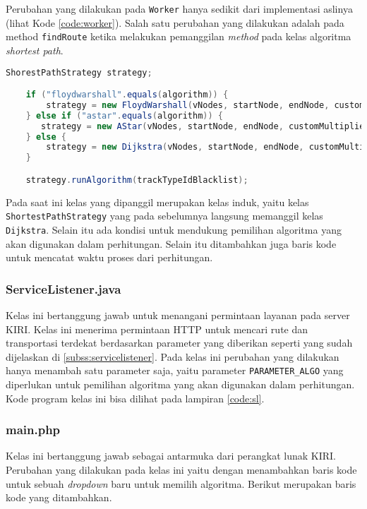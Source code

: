 Perubahan yang dilakukan pada \texttt{Worker} hanya sedikit dari implementasi aslinya (lihat Kode \ref{code:worker}). Salah satu perubahan yang dilakukan adalah pada method \texttt{findRoute} ketika melakukan pemanggilan \textit{method} pada kelas algoritma \textit{shortest path}.
\begin{lstlisting}[language=Java, caption=Worker.java, basicstyle=\small\ttfamily]
    ShorestPathStrategy strategy;

    if ("floydwarshall".equals(algorithm)) {
        strategy = new FloydWarshall(vNodes, startNode, endNode, customMultiplierWalking, customPenaltyTransfer);
	} else if ("astar".equals(algorithm)) {
	   strategy = new AStar(vNodes, startNode, endNode, customMultiplierWalking, customPenaltyTransfer);
	} else {
		strategy = new Dijkstra(vNodes, startNode, endNode, customMultiplierWalking, customPenaltyTransfer);
	}

    strategy.runAlgorithm(trackTypeIdBlacklist);
\end{lstlisting}

Pada saat ini kelas yang dipanggil merupakan kelas induk, yaitu kelas \texttt{ShortestPathStrategy} yang pada sebelumnya langsung memanggil kelas \texttt{Dijkstra}. Selain itu ada kondisi untuk mendukung pemilihan algoritma yang akan digunakan dalam perhitungan. Selain itu ditambahkan juga baris kode untuk mencatat waktu proses dari perhitungan.

\subsubsection{ServiceListener.java}
Kelas ini bertanggung jawab untuk menangani permintaan layanan pada server KIRI. Kelas ini menerima permintaan HTTP untuk mencari rute dan transportasi terdekat berdasarkan parameter yang diberikan seperti yang sudah dijelaskan di \ref{subss:servicelistener}. Pada kelas ini perubahan yang dilakukan hanya menambah satu parameter saja, yaitu parameter \texttt{PARAMETER\_ALGO} yang diperlukan untuk pemilihan algoritma yang akan digunakan dalam perhitungan. Kode program kelas ini bisa dilihat pada lampiran \ref{code:sl}.


\subsubsection{main.php}
Kelas ini bertanggung jawab sebagai antarmuka dari perangkat lunak KIRI. Perubahan yang dilakukan pada kelas ini yaitu dengan menambahkan baris kode untuk sebuah \textit{dropdown} baru untuk memilih algoritma. Berikut merupakan baris kode yang ditambahkan.


